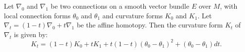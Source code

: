 Let $\nabla_0$ and $\nabla_1$ be two connections on a smooth vector bundle $E$ over $M$, with local connection forms $\theta_0$ and $\theta_1$ and curvature forms $K_0$ and $K_1$. Let $\nabla_t = (1-t)\nabla_0 + t\nabla_1$ be the affine homotopy. Then the curvature form $K_t$ of $\nabla_t$ is given by:
$$
K_t = (1-t)K_0 + tK_1 + t(1-t)(\theta_0 - \theta_1)^2 + (\theta_0 - \theta_1)dt.
$$
